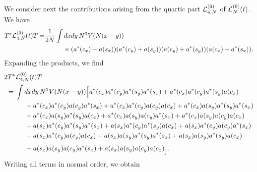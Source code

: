 \documentclass[11pt,a4paper]{article}
\newcommand{\cL}{{\cal L}}
\begin{document}
We consider next the contributions arising from the quartic part $\cL_{4,N}^{(0)}$ of $\cL_N^{(0)} (t)$. We have
\[\begin{split} T^* \cL_{4,N}^{(0)} (t) T = &\frac{1}{2N} \int dx dy \, N^3
V(N (x-y)) \\ &\hspace{1cm} \times (a^* (c_x) + a (s_x)) (a^* (c_y) + a
(s_y)) (a (c_y) + a^* (s_y)) (a(c_x) + a^* (s_x)). \end{split} \] 
Expanding the products, we find 
\[ \begin{split} 
2 T^* & \cL_{4,N}^{(0)} (t) T \\ =  \; & \int dx dy \, N^2 V (N (x-y)) \Big[ a^* (c_x) a^* (c_y) a^* (s_y) a^* (s_x) + a^* (c_x) a^* (c_y) a^* (s_y) a (c_x) \\ &\hspace{.5cm} + a^* (c_x) a^* (c_y) a(c_y) a^* (s_x) + a^* (c_x) a^* (c_y) a (c_y) a (c_x)  + a^* (c_x) a (s_y) a^* (s_y) a^* (s_x)  \\ &\hspace{.5cm}  + a^* (c_x) a (s_y) a^* (s_y) a (c_x) + a^* (c_x) a (s_y) a(c_y) a^* (s_x) + a^* (c_x) a (s_y) a (c_y) a (c_x)  \\ &\hspace{.5cm}  + a (s_x) a^* (c_y) a^* (s_y) a^* (s_x) + a (s_x) a^* (c_y) a^* (s_y) a (c_x) + a (s_x) a^* (c_y) a(c_y) a^* (s_x)  \\ &\hspace{.5cm} + a (s_x) a^* (c_y) a (c_y) a (c_x)  + a (s_x) a (s_y) a^* (s_y) a^* (s_x) + a (s_x) a (s_y) a^* (s_y) a (c_x)  \\ &\hspace{.5cm}  + a (s_x) a (s_y) a(c_y) a^* (s_x) + a (s_x) a (s_y) a (c_y) a (c_x) \Big]. 
\end{split} \]
Writing all terms in normal order, we obtain
\end{document}
